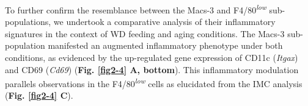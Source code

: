 To further confirm the resemblance between the Macs-3 and F4/80\textsuperscript{\textit{low}} sub-populations, we undertook a comparative analysis of their inflammatory signatures in the context of WD feeding and aging conditions. The Macs-3 sub-population manifested an augmented inflammatory phenotype under both conditions, as evidenced by the up-regulated gene expression of CD11c (\textit{Itgax}) and CD69 (\textit{Cd69}) (\textbf{Fig. \ref{fig2-4} A, bottom}). This inflammatory modulation parallels observations in the F4/80\textsuperscript{\textit{low}} cells as elucidated from the IMC analysis (\textbf{Fig. \ref{fig2-4} C}).\\




